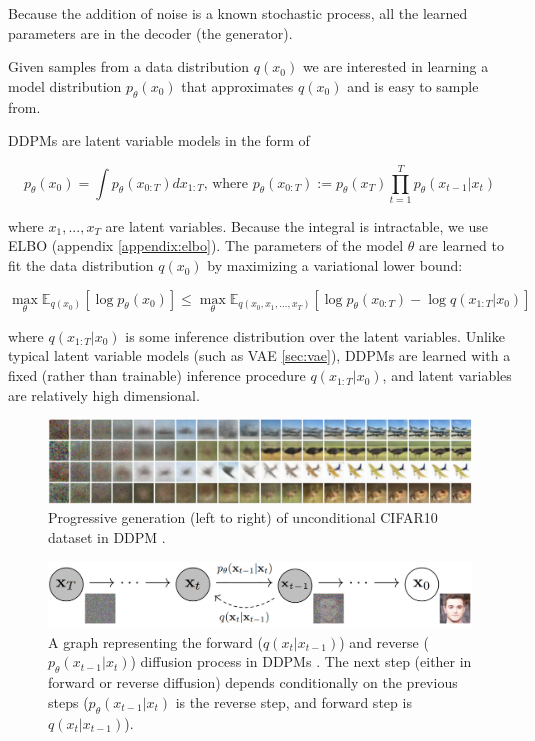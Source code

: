 Because the addition of noise is a known stochastic process, all the learned parameters are in the decoder (the generator).

Given samples from a data distribution $q(x_0)$ we are interested in learning a model distribution $p_\theta (x_0)$ that approximates $q(x_0)$ and is easy to sample from.

DDPMs are latent variable models in the form of 

\begin{equation}
    p_\theta (x_0) = \int p_\theta(x_{0:T}) dx_{1:T} \text{,\ \ where \ \ \ } p_\theta (x_{0:T}) := p_\theta (x_T) \prod_{t=1}^{T} p_\theta (x_{t-1} | x_t)
\end{equation}

where $x_1, ..., x_T$ are latent variables. Because the integral is intractable, we use ELBO (appendix \ref{appendix:elbo}). The parameters of the model $\theta$ are learned to fit the data distribution $q(x_0)$ by maximizing a variational lower bound:

\begin{equation}
    \max_{\theta} \mathbb{E}_{q(x_0)} [\log p_\theta (x_0)] \leq \max_\theta \mathbb{E}_{q(x_0, x_1, ..., x_T)} [\log p_\theta (x_{0:T}) - \log q(x_{1:T} | x_0)]
\end{equation}

where $q(x_{1:T} | x_0)$ is some inference distribution over the latent variables. Unlike typical latent variable models (such as VAE \ref{sec:vae}), DDPMs are learned with a fixed (rather than trainable) inference procedure $q(x_{1:T} | x_0)$, and latent variables are relatively high dimensional.


\begin{figure}
    \centering
    \includegraphics[width=1\textwidth]{images/diffusion_models/ddpm_denoise.png}
    \caption{Progressive generation (left to right) of unconditional CIFAR10 dataset in DDPM \cite{ddpm}.}
\end{figure}


\begin{figure}
    \centering
    \includegraphics[width=1\textwidth]{images/diffusion_models/ddpm_process.png}
    \caption{A graph representing the forward ($q(x_t | x_{t-1})$) and reverse ($p_\theta(x_{t-1} | x_t)$) diffusion process in DDPMs \cite{ddpm}. The next step (either in forward or reverse diffusion) depends conditionally on the previous steps ($p_\theta (x_{t-1} | x_t)$ is the reverse step, and forward step is $q(x_t | x_{t-1})$).}
    \label{fig:ddpm_process}
\end{figure}




